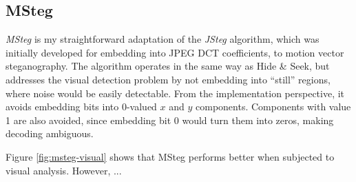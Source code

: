 \documentclass[12pt,british,twoside,notitlepage,usenames,dvipsnames,hypens,final]{report}
\numberwithin{equation}{section}
\numberwithin{figure}{section}
\begin{document}
\subsection{MSteg}


\emph{MSteg} is my straightforward adaptation of the \emph{JSteg} algorithm, which was initially developed for embedding into JPEG DCT coefficients, to motion vector steganography. The algorithm operates in the same way as Hide \& Seek, but addresses the visual detection problem by not embedding into ``still'' regions, where noise would be easily detectable. From the implementation perspective, it avoids embedding bits into 0-valued $x$ and $y$ components. Components with value 1 are also avoided, since embedding bit 0 would turn them into zeros, making decoding ambiguous.

Figure \ref{fig:msteg-visual} shows that MSteg performs better when subjected to visual analysis. However, ...

\end{document}
